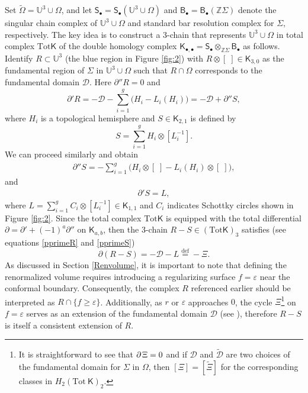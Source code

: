 \documentclass[a4paper,11pt]{article}
\newcommand{\SchottkyFund}{\mathcal{D}}
\newcommand{\compfontdii}[1]{\bm{\mathsf{#1}}_{\bullet , \bullet}}
\newcommand{\compfontdi}[1]{\bm{\mathsf{#1}}_{\bullet}}
\newcommand{\compfont}[1]{\bm{\mathsf{#1}}}
\begin{document}
Set $\tilde\Omega=\mathbb{U}^3\cup \Omega $, and let $\compfontdi{S}=\compfontdi{S}(\mathbb{U}^3\cup \Omega)$ and $\compfontdi{B}=\compfontdi{B}(\mathbb{Z}\Sigma)$ denote the singular chain complex of $\mathbb{U}^3\cup \Omega$ and standard bar resolution complex for $\Sigma$, respectively. The key idea is to construct a 3-chain that represents $\mathbb{U}^3\cup \Omega$ in total complex $\text{Tot} \compfont{K}$ of the double homology complex $\compfontdii{K}= \compfontdi{S} \otimes_{\mathbb{Z}\Sigma} \compfontdi{B}$ as follows. Identify $R\subset \mathbb{U}^3$ (the blue region in Figure \ref{fig:2}) with $R\otimes[\;] \in \compfont{K}_{3,0}$ as the fundamental region of $\Sigma$ in $\mathbb{U}^3\cup\Omega$ such that $R\cap\Omega$ corresponds to the fundamental domain $\SchottkyFund$. Here $\partial''R=0$ and
\begin{equation}
\partial' R = -\SchottkyFund- \sum_{i=1}^{g} \big(H_i -L_i(H_i)\big) = -\SchottkyFund + \partial'' S,\label{pprimeR}
\end{equation}
where $H_i$ is a topological hemisphere and $S \in \compfont{K}_{2,1}$ is defined by
\begin{equation}
S = \sum_{i=1}^{g} H_i \otimes [L_i^{-1}].\label{}
\end{equation}
We can proceed similarly and obtain
\begin{equation}
\begin{aligned}
\partial'' S = -
\sum_{i=1}^{g} \big(H_i\otimes [\;] - L_i(H_i) \otimes [\;]\big),
\end{aligned}
\end{equation}
and
\begin{equation}
\begin{aligned}
\partial'S = L,\label{pprimeS}
\end{aligned}
\end{equation}
where $L= \sum_{i=1}^{g} C_i \otimes [L_i^{-1}] \in \compfont{K}_{1,1}$ and $C_i$ indicates Schottky circles shown in Figure \ref{fig:2}. Since the total complex $\text{Tot} \compfont{K}$ is equipped with the total differential $\partial= \partial'+(-1)^a \partial''$ on $\compfont{K}_{a,b}$, then the 3-chain $R-S \in (\text{Tot}\compfont{K})_3$ satisfies (see equations \eqref{pprimeR} and \eqref{pprimeS})
\begin{equation}
\partial (R-S) = -\SchottkyFund -L\overset{\text{def}}{=}-\Xi.\label{RmS}
\end{equation} 
As discussed in Section \ref{Renvolume}, it is important to note that defining the renormalized volume requires introducing a regularizing surface $f=\varepsilon$ near the conformal boundary. Consequently, the complex $R$ referenced earlier should be interpreted as $R\cap \{f\geq \varepsilon\}$. Additionally, as $r$ or $ \varepsilon$ approaches $0$, the cycle 
$\Xi$\footnote{It is straightforward to see that $\partial\hspace{.4mm}\Xi=0$ and if $\SchottkyFund$ and $\tilde{\SchottkyFund}$ are two choices of the fundamental domain for $\Sigma$ in $\Omega$, then $[\Xi]=[\tilde{\Xi}]$ for the corresponding classes in $H_2(\text{Tot}~\compfont{K})_2$.}  on $f=\varepsilon$
serves as an extension of the fundamental domain $\SchottkyFund$ (see \cite{aldrovandi_1997}), therefore $R-S$  is itself a consistent extension of $R$.
\end{document}
